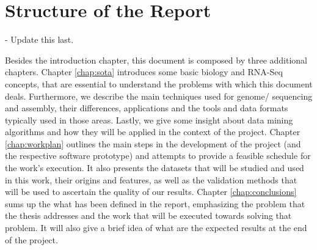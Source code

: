\section{Structure of the Report} \label{sec:outline}

\begin{Notes}
- Update this last.\\
\end{Notes}

Besides the introduction chapter, this document is composed by three additional
chapters. Chapter \ref{chap:sota} introduces some basic biology and RNA-Seq
concepts, that are essential to understand the problems with which this document
deals. Furthermore, we describe the main techniques used for genome/\trans{}
sequencing and assembly, their differences, applications and the tools and data
formats typically used in those areas. Lastly, we give some insight about data
mining algorithms and how they will be applied in the context of the project.
Chapter \ref{chap:workplan} outlines the main steps in the development of the
project (and the respective software prototype) and attempts to provide a
feasible schedule for the work's execution. It also presents the datasets that
will be studied and used in this work, their origins and features, as well as
the validation methods that will be used to ascertain the quality of our
results. Chapter \ref{chap:conclusions} sums up the what has been defined in the
report, emphasizing the problem that the thesis addresses and the work that will
be executed towards solving that problem. It will also give a brief idea of what
are the expected results at the end of the project.
